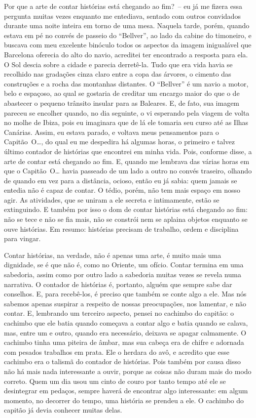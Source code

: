 Por que a arte de contar histórias está chegando ao fim?~-- eu já me
fizera essa pergunta muitas vezes enquanto me entediava, sentado com
outros convidados durante uma noite inteira em torno de uma mesa.
Naquela tarde, porém, quando estava em pé no convés de passeio do
``Bellver'', ao lado da cabine do timoneiro, e buscava com meu excelente
binóculo todos os aspectos da imagem inigualável que Barcelona oferecia
do alto do navio, acreditei ter encontrado a resposta para ela. O Sol
descia sobre a cidade e parecia derretê-la. Tudo que era vida havia se
recolhido nas gradações cinza claro entre a copa das árvores, o cimento
das construções e a rocha das montanhas distantes. O ``Bellver'' é um
navio a motor, belo e espaçoso, ao qual se gostaria de creditar um
encargo maior do que o de abastecer o pequeno trânsito insular para as
Baleares. E, de fato, sua imagem pareceu se encolher quando, no dia
seguinte, o vi esperando pela viagem de volta no molhe de Ibiza, pois eu
imaginara que de lá ele tomaria seu curso até as Ilhas Canárias. Assim,
eu estava parado, e voltava meus pensamentos para o Capitão~O\ldots{}, do
qual eu me despedira há algumas horas, o primeiro e talvez último
contador de histórias que encontrei em minha vida. Pois, conforme disse,
a arte de contar está chegando ao fim. E, quando me lembrava das várias
horas em que o Capitão~O\ldots{} havia passeado de um lado a outro no convés
traseiro, olhando de quando em vez para a distância, ocioso, então eu já
sabia: quem jamais se entedia não é capaz de contar. O tédio, porém, não
tem mais espaço em nosso agir. As atividades, que se uniram a ele
secreta e intimamente, estão se extinguindo. E também por isso o dom de
contar histórias está chegando ao fim: não se tece e não se fia mais,
não se constrói nem se aplaina objetos enquanto se ouve histórias. Em
resumo: histórias precisam de trabalho, ordem e disciplina para vingar.

Contar histórias, na verdade, não é apenas uma arte, é muito mais uma
dignidade, se é que não é, como no Oriente, um ofício. Contar termina em
uma sabedoria, assim como por outro lado a sabedoria muitas vezes se
revela numa narrativa. O contador de histórias é, portanto, alguém que
sempre sabe dar conselhos. E, para recebê-los, é preciso que também se
conte algo a ele. Mas nós sabemos apenas suspirar a respeito de nossas
preocupações, nos lamentar, e não contar. E, lembrando um terceiro
aspecto, pensei no cachimbo do capitão: o cachimbo que ele batia quando
começava a contar algo e batia quando se calava, mas, entre um e outro,
quando era necessário, deixava se apagar calmamente. O cachimbo
tinha uma piteira de âmbar, mas sua cabeça era de chifre e adornada com
pesados trabalhos em prata. Ele o herdara do avô, e acredito que esse
cachimbo era o talismã do contador de histórias. Pois também por causa
disso não há mais nada interessante a ouvir, porque as coisas não duram
mais do modo correto. Quem um dia usou um cinto de couro por tanto tempo
até ele se desintegrar em pedaços, sempre haverá de encontrar algo
interessante: em algum momento, no decorrer do tempo, uma história se
prendeu a ele. O cachimbo do capitão já devia conhecer muitas delas.

